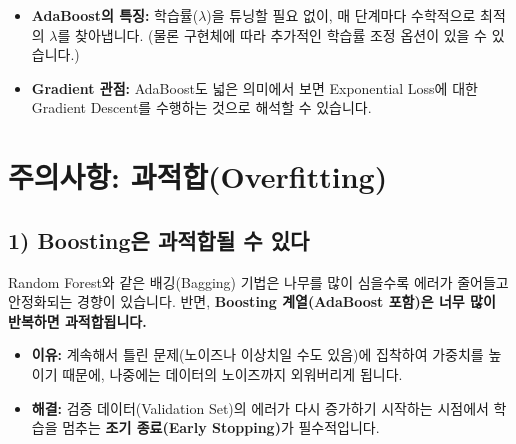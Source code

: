 \documentclass[11pt,a4paper]{book}
\theoremstyle{definition}
\begin{document}
\begin{table}[h]
    \centering
    \caption{Gradient Boosting과 AdaBoost의 차이점}
    \label{tab:comparison}
\end{table}

\begin{itemize}
    \item \textbf{AdaBoost의 특징:} 학습률($\lambda$)을 튜닝할 필요 없이, 매 단계마다 수학적으로 최적의 $\lambda$를 찾아냅니다. (물론 구현체에 따라 추가적인 학습률 조정 옵션이 있을 수 있습니다.)
    \item \textbf{Gradient 관점:} AdaBoost도 넓은 의미에서 보면 Exponential Loss에 대한 Gradient Descent를 수행하는 것으로 해석할 수 있습니다.
\end{itemize}


\section{주의사항: 과적합(Overfitting)}

\subsection{1) Boosting은 과적합될 수 있다}
Random Forest와 같은 배깅(Bagging) 기법은 나무를 많이 심을수록 에러가 줄어들고 안정화되는 경향이 있습니다. 반면, \textbf{Boosting 계열(AdaBoost 포함)은 너무 많이 반복하면 과적합됩니다.}
\begin{itemize}
    \item \textbf{이유:} 계속해서 틀린 문제(노이즈나 이상치일 수도 있음)에 집착하여 가중치를 높이기 때문에, 나중에는 데이터의 노이즈까지 외워버리게 됩니다.
    \item \textbf{해결:} 검증 데이터(Validation Set)의 에러가 다시 증가하기 시작하는 시점에서 학습을 멈추는 \textbf{조기 종료(Early Stopping)}가 필수적입니다.
\end{itemize}
\end{document}
